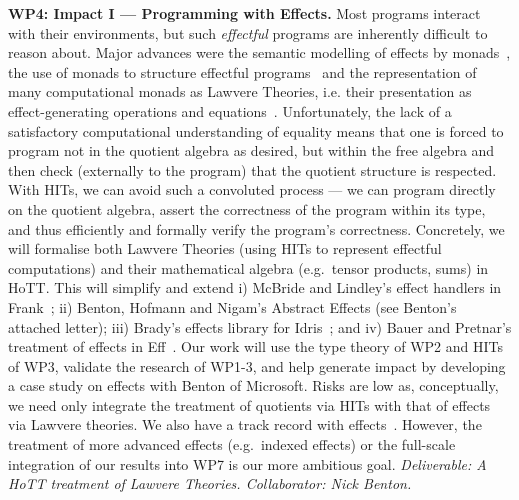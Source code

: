 \documentclass[a4paper,11pt]{article}
\newcommand{\eg}{{e.g.}\ }
\begin{document}
{\bf WP4: Impact I --- Programming with Effects.}  Most programs
interact with their environments, but such \emph{effectful} programs
are inherently difficult to reason about.  Major advances were the
semantic modelling of effects by monads~\cite{moggi:monad}, the use of
monads to structure effectful programs~\cite{wadler:monads} and the
representation of many computational monads as Lawvere Theories,
i.e. their presentation as effect-generating operations and
equations~\cite{PlotkinPower:Lawvere}. Unfortunately, the lack of a
satisfactory computational understanding of equality means that one is
forced to program not in the quotient algebra as desired, but within
the free algebra and then check (externally to the program) that the
quotient structure is respected.  With HITs, we can avoid such a
convoluted process --- we can program directly on the quotient
algebra, assert the correctness of the program within its type,
and thus efficiently and formally verify the program's
correctness. Concretely, we will formalise both Lawvere Theories
(using HITs to represent effectful computations) and their
mathematical algebra (e.g.\ tensor products, sums) in HoTT.  This will
simplify and extend i) McBride and Lindley's effect handlers in
Frank~\cite{conor:frank}; ii) Benton, Hofmann and Nigam's Abstract
Effects (see Benton's attached letter); iii) Brady's effects library
for Idris~\cite{brady:effects}; and iv) Bauer and Pretnar's treatment
of effects in Eff~\cite{bauer:eff}.  Our work will use the type theory
of WP2 and HITs of WP3, validate the research of WP1-3,
and help generate impact by developing a case study on effects with Benton of Microsoft.
Risks are low as,
conceptually, we need only integrate the treatment of quotients
via HITs with that of effects via Lawvere theories. We also have a
track record with effects~\cite{alti:beast,conor:frank,atkeyGhaniJacobsJohann:effects}.
However, the
treatment of more
advanced effects (\eg indexed effects) or the full-scale integration
of our results into WP7 is our more ambitious goal. {\em Deliverable: A HoTT
treatment of Lawvere Theories.  Collaborator: Nick
Benton.  }
\end{document}
